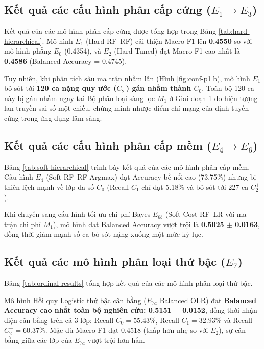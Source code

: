 \subsection{Kết quả các cấu hình phân cấp cứng ($E_1 \to E_3$)}
Kết quả của các mô hình phân cấp cứng được tổng hợp trong Bảng \ref{tab:hard-hierarchical}. Mô hình $E_1$ (Hard RF--RF) cải thiện Macro-F1 lên \textbf{0.4550} so với mô hình phẳng $E_0$ (0.4354), và $E_2$ (Hard Tuned) đạt Macro-F1 cao nhất là \textbf{0.4586} (Balanced Accuracy = 0.4745).



Tuy nhiên, khi phân tích sâu ma trận nhầm lẫn (Hình \ref{fig:conf-p1}b), mô hình $E_1$ bỏ sót tới \textbf{120 ca nặng quy ước ($C_2^+$) gán nhầm thành $C_0$}. Toàn bộ 120 ca này bị gán nhầm ngay tại Bộ phân loại sàng lọc $M_1$ ở Giai đoạn 1 do hiện tượng lan truyền sai số một chiều, chứng minh nhược điểm chí mạng của định tuyến cứng trong ứng dụng lâm sàng.

\subsection{Kết quả các cấu hình phân cấp mềm ($E_4 \to E_6$)}
Bảng \ref{tab:soft-hierarchical} trình bày kết quả của các mô hình phân cấp mềm. Cấu hình $E_4$ (Soft RF--RF Argmax) đạt Accuracy bề nổi cao (73.75\%) nhưng bị thiên lệch mạnh về lớp đa số $C_0$ (Recall $C_1$ chỉ đạt 5.18\% và bỏ sót tới 227 ca $C_2^+$).



Khi chuyển sang cấu hình tối ưu chi phí Bayes $E_{6b}$ (Soft Cost RF--LR với ma trận chi phí $M_1$), mô hình đạt Balanced Accuracy vượt trội là \textbf{0.5025 $\pm$ 0.0163}, đồng thời giảm mạnh số ca bỏ sót nặng xuống một mức kỷ lục.

\subsection{Kết quả các mô hình phân loại thứ bậc ($E_7$)}
Bảng \ref{tab:ordinal-results} tổng hợp kết quả của các mô hình phân loại thứ bậc.



Mô hình Hồi quy Logistic thứ bậc cân bằng ($E_{7a}$ Balanced OLR) đạt \textbf{Balanced Accuracy cao nhất toàn bộ nghiên cứu: 0.5151 $\pm$ 0.0152}, đồng thời nhận diện cân bằng trên cả 3 lớp: Recall $C_0 = 55.43\%$, Recall $C_1 = 32.93\%$ và Recall $C_2^+ = 60.37\%$. Mặc dù Macro-F1 đạt 0.4518 (thấp hơn nhẹ so với $E_2$), sự cân bằng giữa các lớp của $E_{7a}$ vượt trội hơn hẳn.

